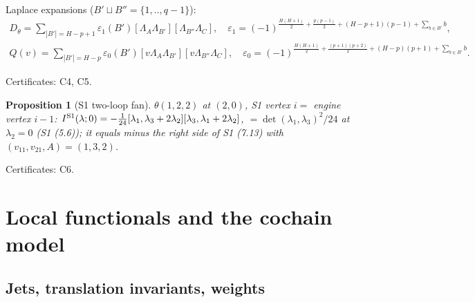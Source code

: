 \documentclass[10pt,a4paper]{article}
\numberwithin{equation}{section}
\newtheorem{proposition}[theorem]{Proposition}
\theoremstyle{definition}
\theoremstyle{remark}
\newcommand{\cert}[1]{\par\noindent\textup{Certificates: #1.}\par}
\begin{document}
Laplace expansions ($B'\sqcup B''=\{1,..,q-1\}$):
\begin{gather}
D_\theta=\sum_{|B'|=H-p+1}\varepsilon_1(B')[\Lambda_A\Lambda_{B'}][\Lambda_{B''}\Lambda_C],\quad \varepsilon_1=(-1)^{\frac{H(H+1)}2+\frac{p(p-1)}2+(H-p+1)(p-1)+\sum_{b\in B'}b},\\
Q(v)=\sum_{|B'|=H-p}\varepsilon_0(B')[v\Lambda_A\Lambda_{B'}][v\Lambda_{B''}\Lambda_C],\quad \varepsilon_0=(-1)^{\frac{H(H+1)}2+\frac{(p+1)(p+2)}2+(H-p)(p+1)+\sum_{b\in B'}b}.
\end{gather}
\cert{C4, C5}

\begin{proposition}[S1 two-loop fan]\label{prop-sourcevals}
$\theta(1,2,2)$ at $(2,0)$, S1 vertex $i=$ engine vertex $i-1$: $I^{\rm S1}(\lambda;0)=-\frac1{24}[\lambda_1,\lambda_3+2\lambda_2][\lambda_3,\lambda_1+2\lambda_2]$, $=\det(\lambda_1,\lambda_3)^2/24$ at $\lambda_2=0$ (S1 (5.6)); it equals minus the right side of S1 (7.13) with $(v_{11},v_{21},A)=(1,3,2)$.
\end{proposition}
\cert{C6}

\section{Local functionals and the cochain model}\label{sec-h1}

\subsection{Jets, translation invariants, weights}\label{sec-jets}
\end{document}
